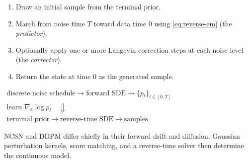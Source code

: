 \documentclass[11pt,a4paper]{article}
\begin{document}
\begin{enumerate}[label=\textbf{\arabic*.},nosep]
  \item Draw an initial sample from the terminal prior.
  \item March from noise time $T$ toward data time $0$ using
        \eqref{eq:reverse-em} (the \emph{predictor}).
  \item Optionally apply one or more Langevin correction steps at each noise
        level (the \emph{corrector}).
  \item Return the state at time $0$ as the generated sample.
\end{enumerate}

\begin{tcolorbox}[
  enhanced,colback=mydarkblue!4,colframe=mydarkblue!45,
  arc=3pt,boxrule=0.6pt,title={\bfseries Framework in one line},
  fonttitle=\small,top=2pt,bottom=2pt
]
\centering
{\small$\boxed{\begin{gathered}
    \text{discrete noise schedule}
    \longrightarrow \text{forward SDE}
    \longrightarrow \{p_t\}_{t\in[0,T]} \\
    \scriptstyle \text{learn }\nabla_x\log p_t
    \quad\Downarrow\quad \\
    \text{terminal prior}
    \longrightarrow \text{reverse-time SDE}
    \longrightarrow \text{samples}
  \end{gathered}}$}\par\smallskip
\raggedright\small
NCSN and DDPM differ chiefly in their forward drift and diffusion.  Gaussian
perturbation kernels, score matching, and a reverse-time solver then determine
the continuous model.
\end{tcolorbox}
\end{document}
